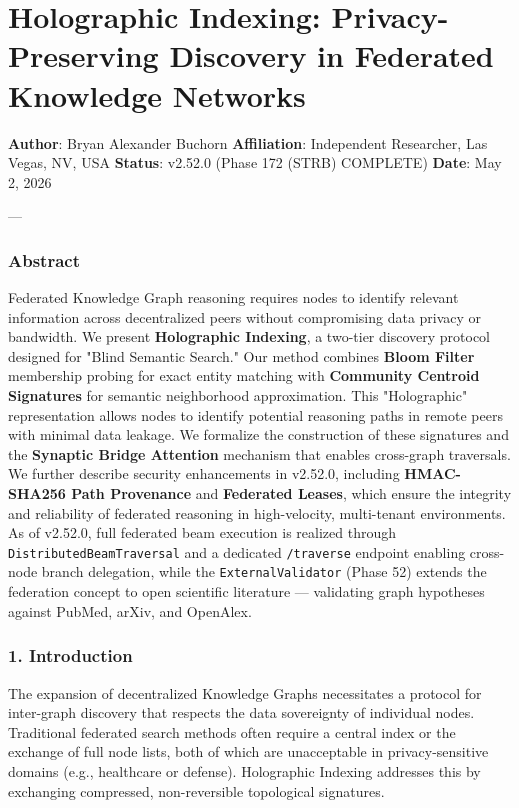 \section{Holographic Indexing: Privacy-Preserving Discovery in Federated Knowledge Networks}

\textbf{Author}: Bryan Alexander Buchorn  
\textbf{Affiliation}: Independent Researcher, Las Vegas, NV, USA  
\textbf{Status}: v2.52.0 (Phase 172 (STRB) COMPLETE)
\textbf{Date}: May 2, 2026

---

\subsubsection{Abstract}
Federated Knowledge Graph reasoning requires nodes to identify relevant information across decen\-tralized peers without compr\-omising data privacy or bandwidth. We present \textbf{Holographic Indexing}, a two-tier discovery protocol designed for "Blind Semantic Search." Our method combines \textbf{Bloom Filter} \cite{bloom1970} membership probing for exact entity matching with \textbf{Community Centroid Signatures} for semantic neigh\-borhood appro\-ximation. This "Holographic" repre\-sentation allows nodes to identify potential reasoning paths in remote peers with minimal data leakage. We formalize the const\-ruction of these signatures and the \textbf{Synaptic Bridge Attention} mechanism that enables cross-graph traversals. We further describe security enhan\-cements in v2.52.0, including \textbf{HMAC-SHA256 Path Provenance} \cite{gentry2009} and \textbf{Federated Leases}, which ensure the integrity and reliability of federated reasoning in high-velocity, multi-tenant envir\-onments. As of v2.52.0, full federated beam execution is realized through \texttt{DistributedBeamTraversal} and a dedicated \texttt{/traverse} endpoint enabling cross-node branch delegation, while the \texttt{ExternalValidator} (Phase 52) extends the federation concept to open scientific literature — validating graph hypotheses against PubMed, arXiv, and OpenAlex.

\subsubsection{1. Introd\-uction}
The expansion of decen\-tralized Knowledge Graphs neces\-sitates a protocol for inter-graph discovery that respects the data sovereignty of individual nodes. Traditional federated search methods often require a central index or the exchange of full node lists, both of which are unacc\-eptable in privacy-sensitive domains (e.g., healthcare or defense). Holographic Indexing addresses this by exchanging compressed, non-reversible topological signatures.

